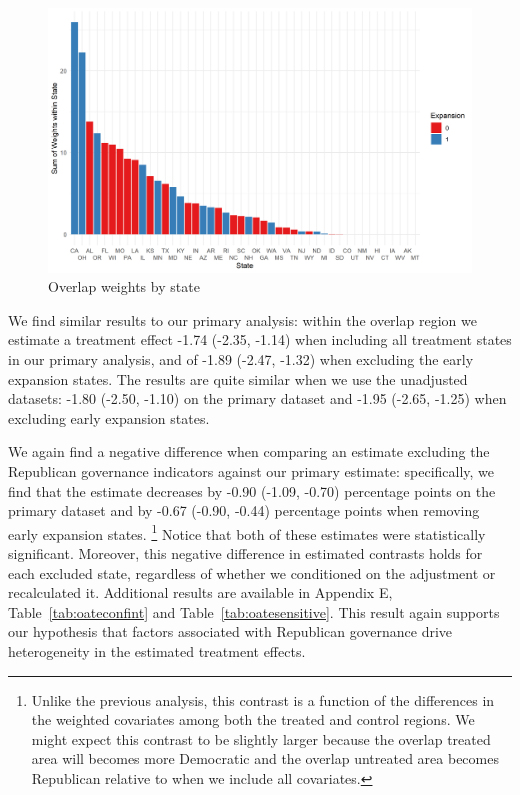 \documentclass[aoas]{imsart}
\theoremstyle{plain}
\theoremstyle{remark}
\begin{document}
\begin{figure}
\begin{center}
    \caption{Overlap weights by state}
    \label{oatearea}
    \includegraphics[scale=0.6]{01_Plots/oate-region-c1-a.png}
\end{center}
\end{figure}

We find similar results to our primary analysis: within the overlap region we estimate a treatment effect -1.74 (-2.35, -1.14) when including all treatment states in our primary analysis, and of -1.89 (-2.47, -1.32) when excluding the early expansion states. The results are quite similar when we use the unadjusted datasets: -1.80 (-2.50, -1.10) on the primary dataset and -1.95 (-2.65, -1.25) when excluding early expansion states. 

We again find a negative difference when comparing an estimate excluding the Republican governance indicators against our primary estimate: specifically, we find that the estimate decreases by -0.90 (-1.09, -0.70) percentage points on the primary dataset and by -0.67 (-0.90, -0.44) percentage points when removing early expansion states. \footnote{Unlike the previous analysis, this contrast is a function of the differences in the weighted covariates among both the treated and control regions. We might expect this contrast to be slightly larger because the overlap treated area will becomes more Democratic and the overlap untreated area becomes Republican relative to when we include all covariates.} Notice that both of these estimates were statistically significant. Moreover, this negative difference in estimated contrasts holds for each excluded state, regardless of whether we conditioned on the adjustment or recalculated it. Additional results are available in Appendix E, Table~\ref{tab:oateconfint} and Table~\ref{tab:oatesensitive}. This result again supports our hypothesis that factors associated with Republican governance drive heterogeneity in the estimated treatment effects.
\end{document}
